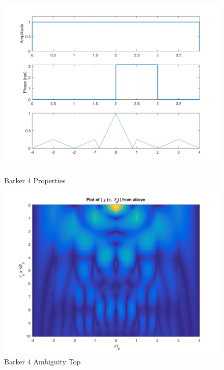 \begin{figure}[!htbp]
  \centering
  \begin{minipage}[b]{0.45\textwidth}
    \includegraphics[width=\textwidth]{images/barker4_props}
    \caption{Barker 4 Properties}
    \label{fig:barker4_props}
  \end{minipage}
  \hfill
      \begin{minipage}[b]{0.45\textwidth}
    \includegraphics[width=\textwidth]{images/barker4_top}
    \caption{Barker 4 Ambiguity Top}
    \label{fig:barker4_top}
  \end{minipage}
\end{figure}
